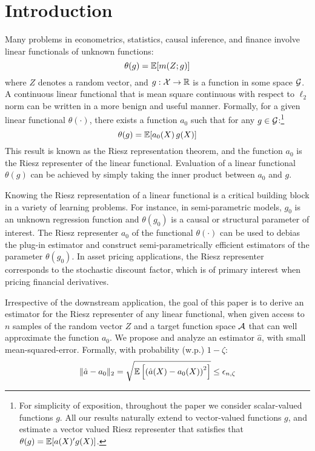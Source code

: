 \section{Introduction}

Many problems in econometrics, statistics, causal inference, and finance involve linear functionals of unknown functions:
\begin{equation}
\theta(g)=\mathbb{E}[m(Z; g)]
\end{equation}
where $Z$ denotes a random vector, and $g: {\mathcal X}\to \mathbb{R}$ is a function in some space $ {\mathcal G}$. A continuous linear functional that is mean square continuous with respect to $\ell_2$ norm can be written in a more benign and useful manner. Formally, for a given linear functional $\theta(\cdot)$, there exists a function $a_0$ such that for any $g\in {\mathcal G}$:\footnote{For simplicity of exposition, throughout the paper we consider scalar-valued functions $g$. All our results naturally extend to vector-valued functions $g$, and estimate a vector valued Riesz representer that satisfies that $\theta(g)=\mathbb{E}[a(X)'g(X)]$.}
\begin{equation}
    \theta(g) = \mathbb{E}[a_0(X)\, g(X)]
\end{equation}
This result is known as the Riesz representation theorem, and the function $a_0$ is the Riesz representer of the linear functional. Evaluation of a linear functional $\theta(g)$ can be achieved by simply taking the inner product between $a_0$ and $g$.

Knowing the Riesz representation of a linear functional is a critical building block in a variety of learning problems. For instance, in semi-parametric models, $g_0$ is an unknown regression function and $\theta(g_0)$ is a causal or structural parameter of interest. The Riesz representer $a_0$ of the functional $\theta(\cdot)$ can be used to debias the plug-in estimator and construct semi-parametrically efficient estimators of the parameter $\theta(g_0)$. In asset pricing applications, the Riesz representer corresponds to the stochastic discount factor, which is of primary interest when pricing financial derivatives.

Irrespective of the downstream application, the goal of this paper is to derive an estimator for the Riesz representer of any linear functional, when given access to $n$ samples of the random vector $Z$ and a target function space ${\mathcal A}$ that can well approximate the function $a_0$. We propose and analyze an estimator $\hat{a}$, with small mean-squared-error. Formally, with probability (w.p.) $1-\zeta$:
\begin{equation}
    \|\hat{a}-a_0\|_2 = \sqrt{\mathbb{E}\left[\left(\hat{a}(X) - a_0(X)\right)^2\right]} \leq \epsilon_{n,\zeta}
\end{equation}

